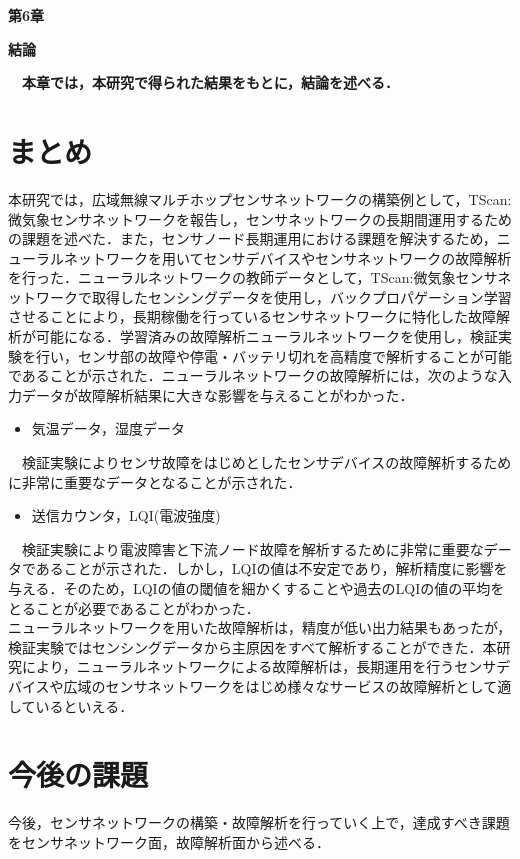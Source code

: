 \newpage
\setcounter{chapter}{6}
\setcounter{section}{0}

\begin{center}	
\vspace{0.5cm}
\huge{\bf 第6章}
\par
\vspace{1cm}
\hrulefill
\par
\vspace{1cm}
\huge{\bf 結論}
\par
\vspace{0.5cm}
\hrulefill
\vspace{1cm}
\par

\begin{flushleft}
\large{{\bf　本章では，本研究で得られた結果をもとに，結論を述べる．}}
\end{flushleft}
\end{center}

\newpage

\section{まとめ}
本研究では，広域無線マルチホップセンサネットワークの構築例として，TScan:微気象センサネットワークを報告し，センサネットワークの長期間運用するための課題を述べた．また，センサノード長期運用における課題を解決するため，ニューラルネットワークを用いてセンサデバイスやセンサネットワークの故障解析を行った．ニューラルネットワークの教師データとして，TScan:微気象センサネットワークで取得したセンシングデータを使用し，バックプロパゲーション学習させることにより，長期稼働を行っているセンサネットワークに特化した故障解析が可能になる．学習済みの故障解析ニューラルネットワークを使用し，検証実験を行い，センサ部の故障や停電・バッテリ切れを高精度で解析することが可能であることが示された．ニューラルネットワークの故障解析には，次のような入力データが故障解析結果に大きな影響を与えることがわかった．
\begin{itemize}
\item 気温データ，湿度データ
\end{itemize}
　検証実験によりセンサ故障をはじめとしたセンサデバイスの故障解析するために非常に重要なデータとなることが示された．
\begin{itemize}
\item 送信カウンタ，LQI(電波強度)
\end{itemize}
　検証実験により電波障害と下流ノード故障を解析するために非常に重要なデータであることが示された．しかし，LQIの値は不安定であり，解析精度に影響を与える．そのため，LQIの値の閾値を細かくすることや過去のLQIの値の平均をとることが必要であることがわかった．\\

ニューラルネットワークを用いた故障解析は，精度が低い出力結果もあったが，検証実験ではセンシングデータから主原因をすべて解析することができた．本研究により，ニューラルネットワークによる故障解析は，長期運用を行うセンサデバイスや広域のセンサネットワークをはじめ様々なサービスの故障解析として適しているといえる．

\newpage

\section{今後の課題}
今後，センサネットワークの構築・故障解析を行っていく上で，達成すべき課題をセンサネットワーク面，故障解析面から述べる．
